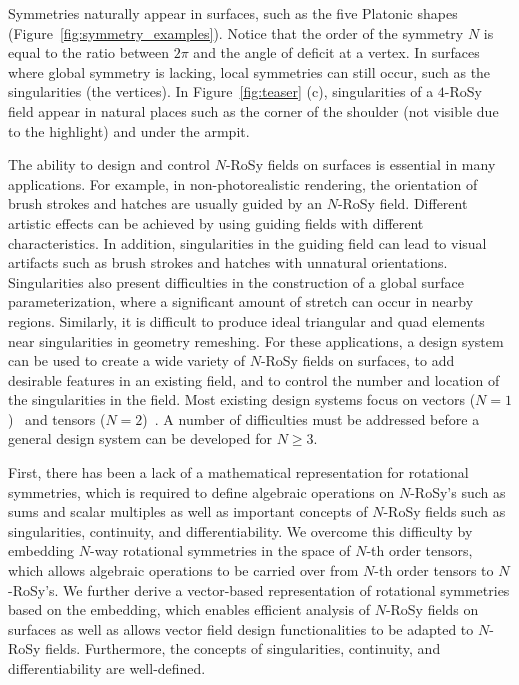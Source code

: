 \documentclass{acmsiggraph}               %
\begin{document}
Symmetries naturally appear in surfaces, such as the five Platonic
shapes (Figure~\ref{fig:symmetry_examples}). Notice that the order
of the symmetry $N$ is equal to the ratio between $2\pi$ and the
angle of deficit at a vertex. In surfaces where global symmetry is
lacking, local symmetries can still occur, such as the singularities
(the vertices). In Figure~\ref{fig:teaser} (c), singularities of a
$4$-RoSy field appear in natural places such as the corner of the
shoulder (not visible due to the highlight) and under the armpit.

The ability to design and control $N$-RoSy fields on surfaces is
essential in many applications. For example, in non-photorealistic
rendering, the orientation of brush strokes and hatches are usually
guided by an $N$-RoSy field. Different artistic effects can be
achieved by using guiding fields with different characteristics. In
addition, singularities in the guiding field can lead to visual
artifacts such as brush strokes and hatches with unnatural
orientations. Singularities also present difficulties in the
construction of a global surface parameterization, where a
significant amount of stretch can occur in nearby regions.
Similarly, it is difficult to produce ideal triangular and quad
elements near singularities in geometry remeshing. For these
applications, a design system can be used to create a wide variety
of $N$-RoSy fields on surfaces, to add desirable features in an
existing field, and to control the number and location of the
singularities in the field. Most existing design systems focus on
vectors
($N=1$)~\cite{Praun:00,Turk:01,Wei:01,Theisel:02,Stam:03,Zhang:06}
and tensors ($N=2$)~\cite{Zhang:07}. A number of difficulties must
be addressed before a general design system can be developed for $N
\ge 3$.

First, there has been a lack of a mathematical representation for
rotational symmetries, which is required to define algebraic
operations on $N$-RoSy's such as sums and scalar multiples as well
as important concepts of $N$-RoSy fields such as singularities,
continuity, and differentiability.
We overcome this difficulty by embedding $N$-way rotational
symmetries in the space of $N$-th order tensors, which allows
algebraic operations to be carried over from $N$-th order tensors to
$N$-RoSy's. We further derive a vector-based representation of
rotational symmetries based on the embedding, which enables
efficient analysis of $N$-RoSy fields on surfaces as well as allows
vector field design functionalities to be adapted to $N$-RoSy
fields. Furthermore, the concepts of singularities, continuity, and
differentiability are well-defined.
\end{document}
